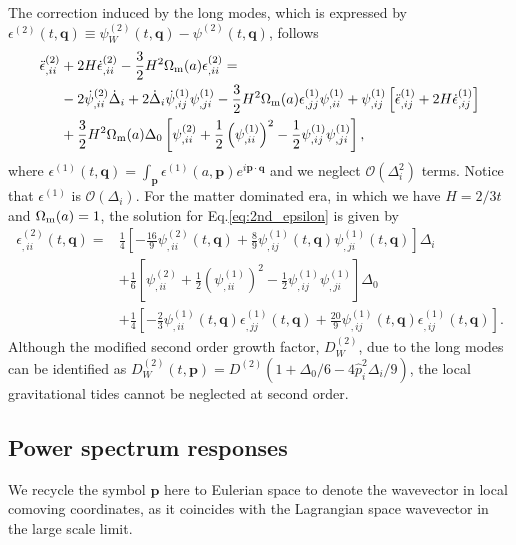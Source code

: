 \documentclass[a4paper,11pt]{article}
\newcommand{\vq}{{\bm q}}
\newcommand{\vp}{{\bm p}}
\begin{document}
The correction induced by the long modes, which is expressed by $\epsilon^{(2)}(t, \vq)\equiv \psi_W^{(2)}(t, \vq) - \psi^{(2)}(t, \vq)$,
follows
\begin{align}
\ddot \epsilon^{(2)}_{,ii} &+ 2H \dot \epsilon^{(2)}_{,ii} - \frac32 H^2 \Omega_{\rm m}(a) \epsilon_{,ii}^{(2)}=
\nonumber\\
&-2\dot\psi^{(2)}_{,ii} \dot\Delta_i + 2\dot\Delta_i\dot\psi_{,ij}^{(1)}\psi_{,ji}^{(1)}
-\frac32 H^2 \Omega_{\rm m}(a) \epsilon^{(1)}_{,jj}\psi^{(1)}_{,ii} + \psi^{(1)}_{,ij} \left[ \ddot\epsilon_{,ij}^{(1)} + 2H\dot\epsilon_{,ij}^{(1)} \right]
\nonumber\\
&+\frac32 H^2 \Omega_{\rm m}(a)\Delta_0\left[ \psi_{,ii}^{(2)} + \frac12\left( \psi^{(1)}_{,ii}\right)^2- \frac12\psi^{(1)}_{,ij}\psi^{(1)}_{,ji} \right],
\label{eq:2nd_epsilon}
\end{align}
where $\epsilon^{(1)}(t,\vq) = \int_\vp \epsilon^{(1)}(a, \vp)e^{i\vp\cdot\vq}$
and we neglect $\mathcal{O}(\Delta_i^2)$ terms.
Notice that $\epsilon^{(1)}$ is $\mathcal{O}(\Delta_i)$.
For the matter dominated era, in which we have $H=2/3t$ and $\Omega_{\rm m}(a)=1$,
the solution for Eq.\eqref{eq:2nd_epsilon} is given by
\begin{align}
\epsilon^{(2)}_{,ii}(t, \vq)
=&\frac14 \left[-\frac{16}{9}\psi^{(2)}_{,ii}(t,\vq) + \frac89\psi^{(1)}_{,ij}(t,\vq)\psi^{(1)}_{,ji}(t,\vq) \right]\Delta_i
\nonumber\\
&+\frac16 \left[\psi_{,ii}^{(2)} + \frac12\left( \psi^{(1)}_{,ii}\right)^2- \frac12\psi^{(1)}_{,ij}\psi^{(1)}_{,ji}   \right]\Delta_0
\nonumber\\
&+\frac14\left[-\frac23\psi^{(1)}_{,ii}(t,\vq)\epsilon_{,jj}^{(1)}(t,\vq) + \frac{20}{9}\psi^{(1)}_{,ij}(t,\vq)\epsilon_{,ij}^{(1)}(t,\vq)  \right].
\end{align}
Although the modified second order growth factor, $D^{(2)}_W$, due to the long modes can be identified as $D^{(2)}_W (t, \vp) = D^{(2)}(1 + \Delta_0/6 - 4\hat{p}_i^2\Delta_i/9 )$, the local gravitational tides cannot be neglected at second order.


\subsection{Power spectrum responses}
\label{sub:resp}

We recycle the symbol $\vp$ here to Eulerian space to denote the wavevector in
local comoving coordinates, as it coincides with the Lagrangian space
wavevector in the large scale limit.
\end{document}
